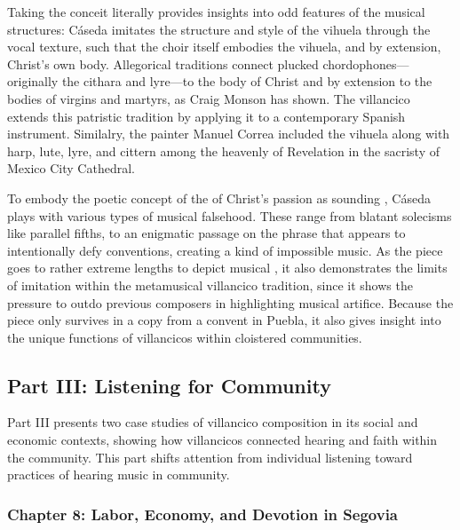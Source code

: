 \documentclass{vcbook-proposal}
\begin{document}
Taking the conceit literally provides insights into odd features of the musical structures: Cáseda imitates the structure and style of the vihuela through the vocal texture, such that the choir itself embodies the vihuela, and by extension, Christ's own body.
Allegorical traditions connect plucked chordophones---originally the cithara and lyre---to the body of Christ and by extension to the bodies of virgins and martyrs, as Craig Monson has shown.
The villancico extends this patristic tradition by applying it to a contemporary Spanish instrument.
Similalry, the painter Manuel Correa included the vihuela along with harp, lute, lyre, and cittern among the heavenly  of Revelation in the sacristy of Mexico City Cathedral.

To embody the poetic concept of the  of Christ's passion as sounding , Cáseda plays with various types of musical falsehood.
These range from blatant solecisms like parallel fifths, to an enigmatic passage on the phrase  that appears to intentionally defy  conventions, creating a kind of impossible music.
As the piece goes to rather extreme lengths to depict musical , it also demonstrates the limits of imitation within the metamusical villancico tradition, since it shows the pressure to outdo previous composers in highlighting musical artifice.
Because the piece only survives in a copy from a convent in Puebla, it also gives insight into the unique functions of villancicos within cloistered communities.

\subsection{Part III: Listening for Community}

Part III presents two case studies of villancico composition in its social and economic contexts, showing how villancicos connected hearing and faith within the community.
This part shifts attention from individual listening toward practices of hearing music in community.

\subsubsection{Chapter 8: Labor, Economy, and Devotion in Segovia}
\end{document}
